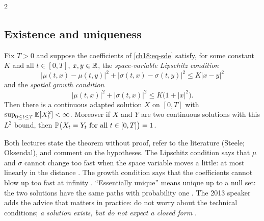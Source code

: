 \begin{paracol}{2}
\subsection{Existence and uniqueness}
\begin{theorem}\label{ch18:thm-eu}
Fix $T>0$ and suppose the coefficients of \eqref{ch18:eq-sde} satisfy, for some constant $K$ and all $t\in[0,T]$, $x,y\in\mathbb{R}$, the \emph{space-variable Lipschitz condition}
\begin{equation}\label{ch18:eq-lip}
  |\mu(t,x)-\mu(t,y)|^2+|\sigma(t,x)-\sigma(t,y)|^2\le K|x-y|^2
\end{equation}
and the \emph{spatial growth condition}
\begin{equation}\label{ch18:eq-growth}
  |\mu(t,x)|^2+|\sigma(t,x)|^2\le K\bigl(1+|x|^2\bigr).
\end{equation}
Then there is a continuous adapted solution $X$ on $[0,T]$ with $\sup_{0\le t\le T}\mathbb{E}[X_t^2]<\infty$. Moreover if $X$ and $Y$ are two continuous solutions with this $L^2$ bound, then $\mathbb{P}\bigl(X_t=Y_t\ \text{for all }t\in[0,T]\bigr)=1$.
\end{theorem}
Both lectures state the theorem without proof, refer to the literature (Steele; Oksendal), and comment on the hypotheses. The Lipschitz condition says that $\mu$ and $\sigma$ cannot change too fast when the space variable moves a little: at most linearly in the distance . The growth condition says that the coefficients cannot blow up too fast at infinity . ``Essentially unique'' means unique up to a null set: the two solutions have the same paths with probability one . The 2013 speaker adds the advice that matters in practice: do not worry about the technical conditions; \emph{a solution exists, but do not expect a closed form} .


\end{paracol}
